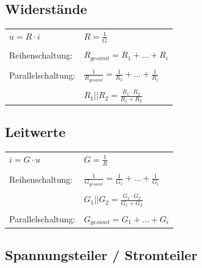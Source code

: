 \documentclass[a4paper,twocolumn,10pt]{article}
\begin{document}
\subsection*{Widerstände}
\begin{tabular}{ll}
$u=R\cdot i$ & $R=\frac{1}{G}$\\\\
Reihenschaltung: & $R_{gesamt}=R_1+...+R_i$\\\\
Parallelschaltung: & $\frac{1}{R_{gesamt}}=\frac{1}{R_1}+...+\frac{1}{R_i}$\\\\
& $R_1||R_2 = \frac{R_1\cdot R_2}{R_1+R_2}$
\end{tabular}

\subsection*{Leitwerte}
\begin{tabular}{ll}
$i=G\cdot u$ & $G=\frac{1}{R}$\\\\
Reihenschaltung: & $\frac{1}{G_{gesamt}}=\frac{1}{G_1}+...+\frac{1}{G_i}$\\\\
& $G_1||G_2 = \frac{G_1\cdot G_2}{G_1+G_2}$\\\\
Parallelschaltung: & $G_{gesamt}=G_1+...+G_i$
\end{tabular}

\subsection*{Spannungsteiler / Stromteiler}
\end{document}
